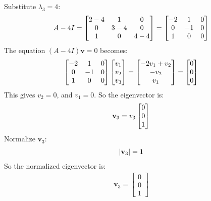 Substitute $\lambda_3 = 4$:
\begin{align}
    A - 4I = \begin{bmatrix}
    2 - 4 & 1 & 0 \\
    0 & 3 - 4 & 0 \\
    1 & 0 & 4 - 4
    \end{bmatrix} = \begin{bmatrix}
    -2 & 1 & 0 \\
    0 & -1 & 0 \\
    1 & 0 & 0
    \end{bmatrix}\notag
\end{align}
The equation $(A - 4I) \mathbf{v} = 0$ becomes:
\begin{align}
    \begin{bmatrix}
    -2 & 1 & 0 \\
    0 & -1 & 0 \\
    1 & 0 & 0
    \end{bmatrix} \begin{bmatrix}
    v_1 \\
    v_2 \\
    v_3
    \end{bmatrix} = \begin{bmatrix}
    -2v_1 + v_2 \\
    -v_2 \\
    v_1
    \end{bmatrix} = \begin{bmatrix}
    0 \\
    0 \\
    0
    \end{bmatrix}\notag
\end{align}
This gives $v_2 = 0$, and $v_1 = 0$. So the eigenvector is:
\begin{align}
    \mathbf{v}_3 = v_3 \begin{bmatrix}
    0 \\
    0 \\
    1
    \end{bmatrix}\notag
\end{align}
Normalize $\mathbf{v}_3$:
\begin{align}
    |\mathbf{v}_3| = 1\notag
\end{align}
So the normalized eigenvector is:
\begin{align}
    \mathbf{v}_3 = \begin{bmatrix}
    0 \\
    0 \\
    1
    \end{bmatrix}
\end{align}
